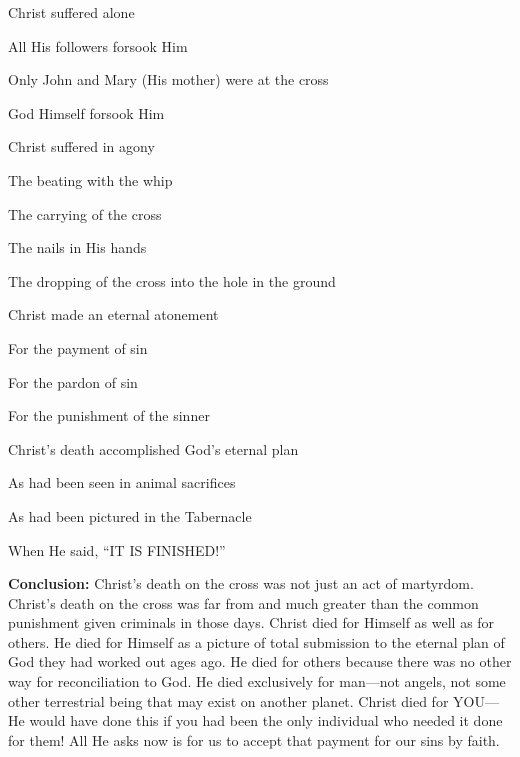 \begin{compactenum}[I.][8]
    \item Christ suffered alone
    \begin{compactenum}[A.][8]
        \item All His followers forsook Him
        \item Only John and Mary (His mother) were at the cross
        \item God Himself forsook Him
    \end{compactenum}
    \item Christ suffered in agony
    \begin{compactenum}[A.][8]
        \item The beating with the whip
        \item The carrying of the cross
        \item The nails in His hands
        \item The dropping of the cross into the hole in the ground
    \end{compactenum}
    \item Christ made an eternal atonement
    \begin{compactenum}[A.][8]
        \item For the payment of sin
        \item For the pardon of sin
        \item For the punishment of the sinner
    \end{compactenum}
    \item Christ’s death accomplished God’s eternal plan
    \begin{compactenum}[A.][8]
        \item As had been seen in animal sacrifices
        \item As had been pictured in the Tabernacle
        \item When He said, “IT IS FINISHED!”
    \end{compactenum}
\end{compactenum}

\noindent  \textbf{Conclusion:} Christ’s death on the cross was not just an act of martyrdom.  Christ’s death on the cross was far from and much greater than the common punishment given criminals in those days.  Christ died for Himself as well as for others.  He died for Himself as a picture of total submission to the eternal plan of God they had worked out ages ago.  He died for others because there was no other way for reconciliation to God.  He died exclusively for man—not angels, not some other terrestrial being that may exist on another planet.  Christ died for YOU—He would have done this if you had been the only individual who needed it done for them!  All He asks now is for us to accept that payment for our sins by faith.


